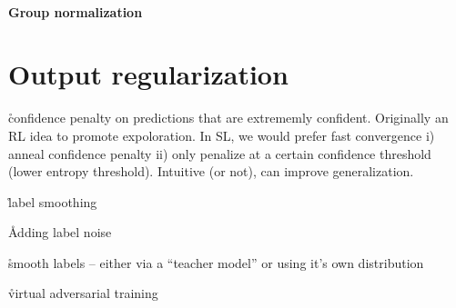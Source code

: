 

\paragraph{Group normalization}


\section{Output regularization}

\r{confidence penalty on predictions that are extrememly confident\cite{pereyra2017regularizing}. Originally an RL idea to promote expoloration. In SL, we would prefer fast convergence i) anneal confidence penalty ii) only penalize at a certain confidence threshold (lower entropy threshold). Intuitive (or not), can improve generalization.}

\r{label smoothing\cite{szegedy2016rethinking}}

\r{Adding label noise\cite{xie2016disturblabel}}

\r{smooth labels -- either via a ``teacher model''\cite{hinton2015distilling} or using it's own distribution\cite{reed2014training}}


\r{virtual adversarial training\cite{miyato2018virtual}}